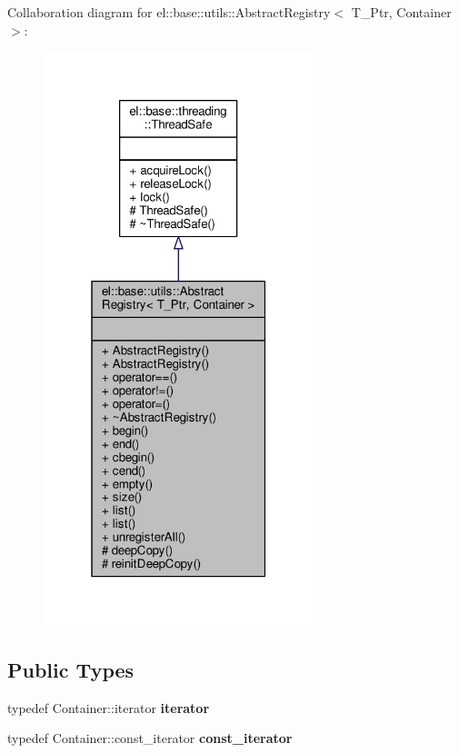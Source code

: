 Collaboration diagram for el\+:\+:base\+:\+:utils\+:\+:Abstract\+Registry$<$ T\+\_\+\+Ptr, Container $>$\+:
\nopagebreak
\begin{figure}[H]
\begin{center}
\leavevmode
\includegraphics[width=223pt]{d3/dcf/classel_1_1base_1_1utils_1_1AbstractRegistry__coll__graph}
\end{center}
\end{figure}
\subsection*{Public Types}
\begin{DoxyCompactItemize}
\item 
typedef Container\+::iterator {\bfseries iterator}\hypertarget{classel_1_1base_1_1utils_1_1AbstractRegistry_a58d0536c748633afd3f7c237b63a9a7c}{}\label{classel_1_1base_1_1utils_1_1AbstractRegistry_a58d0536c748633afd3f7c237b63a9a7c}

\item 
typedef Container\+::const\+\_\+iterator {\bfseries const\+\_\+iterator}\hypertarget{classel_1_1base_1_1utils_1_1AbstractRegistry_a3bbf19b112c067cb1a02a82b003cc7e2}{}\label{classel_1_1base_1_1utils_1_1AbstractRegistry_a3bbf19b112c067cb1a02a82b003cc7e2}

\end{DoxyCompactItemize}
